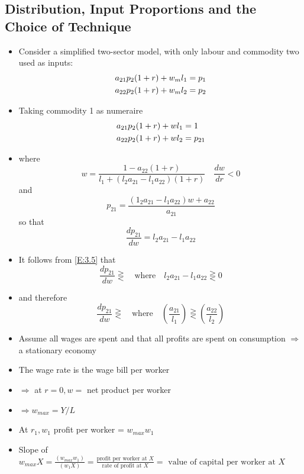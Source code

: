 \documentclass{article}
\begin{document}
\subsection{Distribution, Input Proportions and the Choice of Technique}
	\begin{itemize}
		\item Consider a simplified two-sector model, with only labour and commodity two used as inputs:
		\begin{align}
			a_{21}p_2 (1 + r) + w_m l_1 &= p_1 \notag \\
			a_{22}p_2 (1 + r) + w_m l_2 &= p_2 \label{E:3.1}
		\end{align}
		\item Taking commodity 1 as numeraire  
		\begin{align}
			a_{21}p_2 (1 + r) + w l_1 &= 1 \notag \\
			a_{22}p_2 (1 + r) + w l_2 &= p_{21} \label{E:3.2}
		\end{align}
		\item where
		\begin{equation}
			w = \frac{1 - a_{22} (1 + r)}{l_1 + (l_2 a_{21} - l_1 a_{22}) (1 + r)} \quad \frac{dw}{dr} < 0 \label{E:3.3}
		\end{equation}
		and
		\begin{equation}
			p_{21} = \frac{(1_2 a_{21} - l_1 a_{22}) w + a_{22}}{a_{21}} \label{E:3.4}
		\end{equation}
		so that
		\begin{equation}
			\frac{dp_{21}}{dw} = l_2 a_{21} - l_1 a_{22} \label{E:3.5}
		\end{equation}
		\item It follows from \cref{E:3.5} that
		\begin{equation}
			\frac{dp_{21}}{dw} \gtreqless \quad \text{where} \quad l_2 a_{21} - l_1 a_{22} \gtreqless 0 \label{E:3.6}
		\end{equation}
		\item and therefore
		\begin{equation}
			\frac{dp_{21}}{dw} \gtreqless \quad \text{where} \quad \left( \frac{a_{21}}{l_1} \right) \gtreqless \left( \frac{a_{22}}{l_2} \right) \label{E:3.7}
		\end{equation}
		\item Assume all wages are spent and that all profits are spent on consumption \( \Rightarrow \) a stationary economy 
		\item The wage rate is the wage bill per worker 
		\item \( \Rightarrow \) at \( r = 0, w = \) net product per worker
		\item \( \Rightarrow w_{max} = Y/L \)
		\item At \( r_1, w_1 \) profit per worker = \( w_{max} w_1 \)
		\item Slope of \( w_{max}X = \frac{(w_{max}w_1)}{(w_1 X)} = \frac{\text{profit per worker  at } X}{\text{rate of profit at } X} = \text{ value of capital per worker at } X \)
	\end{itemize}
\end{document}
